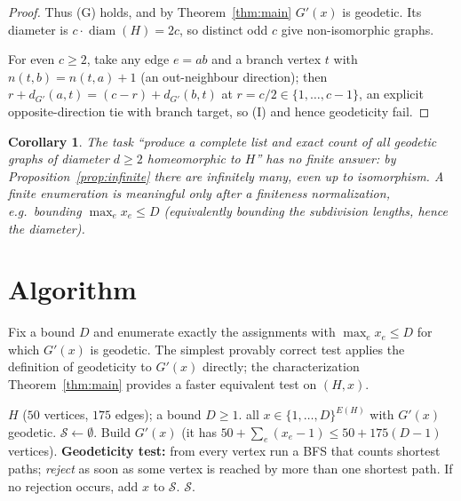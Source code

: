 \documentclass{amsart}
\newtheorem{corollary}{Corollary}
\theoremstyle{definition}
\begin{document}
\begin{proof}
Thus (G) holds, and by Theorem~\ref{thm:main} $G'(x)$ is geodetic. Its diameter
is $c\cdot\operatorname{diam}(H)=2c$, so distinct odd $c$ give non-isomorphic
graphs.

For even $c\ge2$, take any edge $e=ab$ and a branch vertex $t$ with
$n(t,b)=n(t,a)+1$ (an out-neighbour direction); then
$r+d_{G'}(a,t)=(c-r)+d_{G'}(b,t)$ at $r=c/2\in\{1,\dots,c-1\}$, an explicit
opposite-direction tie with branch target, so (I) and hence geodeticity fail.
\end{proof}

\begin{corollary}\label{cor:illposed}
The task ``produce a complete list and exact \emph{count} of all geodetic graphs
of diameter $d\ge2$ homeomorphic to $H$'' has no finite answer: by
Proposition~\ref{prop:infinite} there are infinitely many, even up to
isomorphism. A finite enumeration is meaningful only after a finiteness
normalization, e.g.\ bounding $\max_e x_e\le D$ (equivalently bounding the
subdivision lengths, hence the diameter).
\end{corollary}

\section{Algorithm}

Fix a bound $D$ and enumerate exactly the assignments with $\max_e x_e\le D$
for which $G'(x)$ is geodetic. The simplest provably correct test applies the
definition of geodeticity to $G'(x)$ directly; the characterization
Theorem~\ref{thm:main} provides a faster equivalent test on $(H,x)$.

\begin{algorithm}[H]
\caption{Enumerate geodetic homeomorphs of $H$ with $\max_e x_e\le D$}
\begin{algorithmic}[1]
\Require $H$ ($50$ vertices, $175$ edges); a bound $D\ge1$.
\Ensure all $x\in\{1,\dots,D\}^{E(H)}$ with $G'(x)$ geodetic.
\State $\mathcal S\gets\emptyset$.
  \State Build $G'(x)$ (it has $50+\sum_e(x_e-1)\le 50+175(D-1)$ vertices).
  \State \textbf{Geodeticity test:} from every vertex run a BFS that counts
  shortest paths; \emph{reject} as soon as some vertex is reached by more than
  one shortest path. 
  \State If no rejection occurs, add $x$ to $\mathcal S$.
\EndFor
\State \Return $\mathcal S$.
\end{algorithmic}
\end{algorithm}
\end{document}
